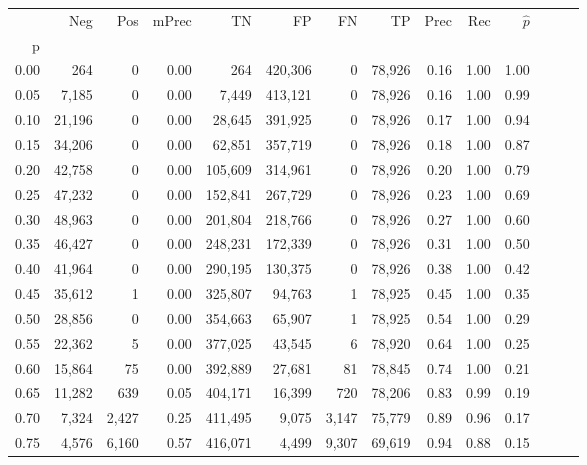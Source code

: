 \begin{tabular}{rrrrrrrrrrrrrr}
\toprule
{} &     Neg &     Pos & mPrec &       TN &       FP &      FN &      TP &  Prec &   Rec & $\hat{p}$ \\
p    &         &         &       &          &          &         &         &       &       &           \\
\midrule
0.00 &     264 &       0 &  0.00 &      264 &  420,306 &       0 &  78,926 &  0.16 &  1.00 &      1.00 \\
0.05 &   7,185 &       0 &  0.00 &    7,449 &  413,121 &       0 &  78,926 &  0.16 &  1.00 &      0.99 \\
0.10 &  21,196 &       0 &  0.00 &   28,645 &  391,925 &       0 &  78,926 &  0.17 &  1.00 &      0.94 \\
0.15 &  34,206 &       0 &  0.00 &   62,851 &  357,719 &       0 &  78,926 &  0.18 &  1.00 &      0.87 \\
0.20 &  42,758 &       0 &  0.00 &  105,609 &  314,961 &       0 &  78,926 &  0.20 &  1.00 &      0.79 \\
0.25 &  47,232 &       0 &  0.00 &  152,841 &  267,729 &       0 &  78,926 &  0.23 &  1.00 &      0.69 \\
0.30 &  48,963 &       0 &  0.00 &  201,804 &  218,766 &       0 &  78,926 &  0.27 &  1.00 &      0.60 \\
0.35 &  46,427 &       0 &  0.00 &  248,231 &  172,339 &       0 &  78,926 &  0.31 &  1.00 &      0.50 \\
0.40 &  41,964 &       0 &  0.00 &  290,195 &  130,375 &       0 &  78,926 &  0.38 &  1.00 &      0.42 \\
0.45 &  35,612 &       1 &  0.00 &  325,807 &   94,763 &       1 &  78,925 &  0.45 &  1.00 &      0.35 \\
0.50 &  28,856 &       0 &  0.00 &  354,663 &   65,907 &       1 &  78,925 &  0.54 &  1.00 &      0.29 \\
0.55 &  22,362 &       5 &  0.00 &  377,025 &   43,545 &       6 &  78,920 &  0.64 &  1.00 &      0.25 \\
0.60 &  15,864 &      75 &  0.00 &  392,889 &   27,681 &      81 &  78,845 &  0.74 &  1.00 &      0.21 \\
0.65 &  11,282 &     639 &  0.05 &  404,171 &   16,399 &     720 &  78,206 &  0.83 &  0.99 &      0.19 \\
0.70 &   7,324 &   2,427 &  0.25 &  411,495 &    9,075 &   3,147 &  75,779 &  0.89 &  0.96 &      0.17 \\
0.75 &   4,576 &   6,160 &  0.57 &  416,071 &    4,499 &   9,307 &  69,619 &  0.94 &  0.88 &      0.15 \\

\end{tabular}
